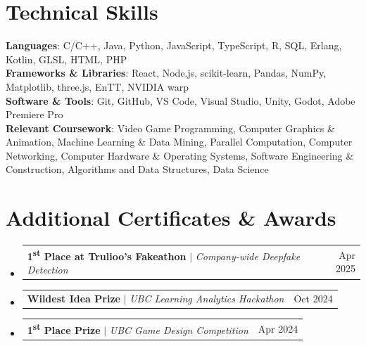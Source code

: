 \documentclass[letterpaper,11pt]{article}
\makeatletter
\newcommand{\resumeProjectHeading}[2]{
    \item
    \begin{tabular*}{0.97\textwidth}{l@{\extracolsep{\fill}}r}
      \small#1 & #2 \\
    \end{tabular*}\vspace{-7pt}
}
\newcommand{\resumeSubHeadingListStart}{\begin{itemize}[leftmargin=0.15in, label={}]}
\newcommand{\resumeSubHeadingListEnd}{\end{itemize}}
\makeatother
\begin{document}
\newcommand{\skills}{
%
\section{Technical Skills}
 \begin{itemize}[leftmargin=0.15in, label={}]
    \small{\item{
     \textbf{Languages}{: C/C++, Java, Python, JavaScript, TypeScript, R, SQL, Erlang, Kotlin, GLSL,  HTML, PHP} \\
     \textbf{Frameworks \& Libraries}{: React, Node.js, scikit-learn, Pandas, NumPy, Matplotlib, three.js, EnTT, NVIDIA warp} \\
     \textbf{Software \& Tools}{: Git, GitHub, VS Code, Visual Studio, Unity, Godot, Adobe Premiere Pro} \\
     \textbf{Relevant Coursework}{: Video Game Programming, Computer Graphics \& Animation, Machine Learning \& Data Mining, Parallel Computation, Computer Networking, Computer Hardware \& Operating Systems, Software Engineering \& Construction, Algorithms and Data Structures, Data Science}
    }}
 \end{itemize}
}
\newcommand{\awards}{
\section{Additional Certificates \& Awards}
  \resumeSubHeadingListStart
    \resumeProjectHeading
      {\textbf{1\textsuperscript{st} Place at Trulioo’s Fakeathon} $|$ \emph{Company-wide Deepfake Detection}}{Apr 2025}
    \resumeProjectHeading
      {\textbf{Wildest Idea Prize} $|$ \emph{UBC Learning Analytics Hackathon}}{Oct 2024}
    \resumeProjectHeading
      {\textbf{1\textsuperscript{st} Place Prize} $|$ \emph{UBC Game Design Competition}}{Apr 2024}
    \resumeSubHeadingListEnd
}

\education
\experience
\projects
\skills
\awards
\end{document}
